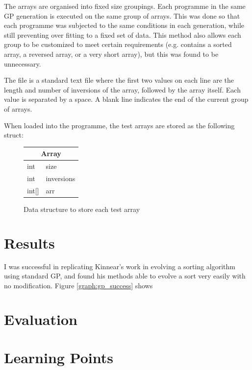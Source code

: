 \documentclass{article}
\begin{document}
        The arrays are organised into fixed size groupings. Each programme in the same GP generation is executed on the same group of arrays. This was done so that each programme was subjected to the same conditions in each generation, while still preventing over fitting to a fixed set of data. This method also allows each group to be customized to meet certain requirements (e.g. contains a sorted array, a reversed array, or a very short array), but this was found to be unnecessary.
        
        The file is a standard text file where the first two values on each line are the length and number of inversions of the array, followed by the array itself. Each value is separated by a space. A blank line indicates the end of the current group of arrays.
        
        When loaded into the programme, the test arrays are stored as the following struct:
        
        \begin{figure}[h]
            \centering
            \begin{tabular}{|l l|}
                \hline
                \multicolumn{2}{|c|}{Array}\\
                \hline
                int & size \\
                int & inversions\\
                int[] & arr\\
                \hline
            \end{tabular}
            \caption{Data structure to store each test array}
            
            \label{struct:array}
        \end{figure}

    \section{Results}

        I was successful in replicating Kinnear's work in evolving a sorting algorithm using standard GP, and found his methods able to evolve a sort very easily with no modification. Figure \ref{graph:gp_success} shows 
    \section{Evaluation}

    \section{Learning Points}
\end{document}
